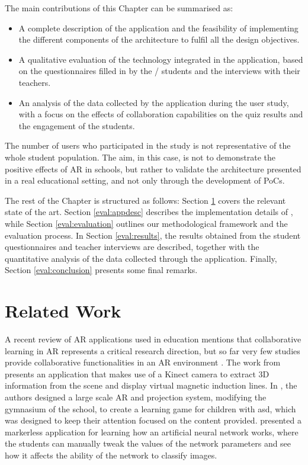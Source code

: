 The main contributions of this Chapter can be summarised as:
\begin{itemize}
    \item A complete description of the application and the feasibility of implementing the different components of the \arch{} architecture to fulfil all the design objectives.
    \item A qualitative evaluation of the technology integrated in the application, based on the questionnaires filled in by the \numstudents/ students and the interviews with their teachers.
    \item An analysis of the data collected by the application during the user study, with a focus on the effects of collaboration capabilities on the quiz results and the engagement of the students.
\end{itemize}

The number of users who participated in the study is not representative of the whole student population. The aim, in this case, is not to demonstrate the positive effects of AR in schools, but rather to validate the architecture presented in a real educational setting, and not only through the development of PoCs.

The rest of the Chapter is structured as follows: Section \ref{eval:related} covers the relevant state of the art.
Section \ref{eval:appdesc} describes the implementation details of \appname{}, while Section \ref{eval:evaluation} outlines our methodological framework and the evaluation process.
In Section \ref{eval:results}, the results obtained from the student questionnaires and teacher interviews are described, together with the quantitative analysis of the data collected through the application.
Finally, Section \ref{eval:conclusion} presents some final remarks. 

\section{Related Work}\label{eval:related}

A recent review of AR applications used in education \citep{eleniiattro} mentions that collaborative learning in AR represents a critical research direction, but so far very few studies provide collaborative functionalities in an AR environment \citep{9645428, choi2017arclassnote}.
The work from \cite{cai2017applications} presents an application that makes use of a Kinect camera to extract 3D information from the scene and display virtual magnetic induction lines.
In \citep{takahashi2018empathic}, the authors designed a large scale AR and projection system, modifying the gymnasium of the school, to create a learning game for children with \gls{asd}, which was designed to keep their attention focused on the content provided.
\cite{laviole2018nectar} presented a markerless application for learning how an artificial neural network works, where the students can manually tweak the values of the network parameters and see how it affects the ability of the network to classify images.

